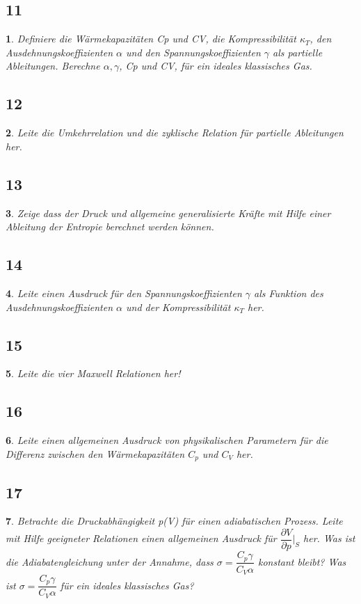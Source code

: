 \documentclass[12pt,a4paper]{report}
\newtheorem{myfrag}{}%
\begin{document}
\subsection{11}
\begin{myfrag}
Definiere die Wärmekapazitäten Cp und CV, die Kompressibilität $\kappa_T$, den
Ausdehnungskoeffizienten $\alpha$ und den Spannungskoeffizienten $\gamma$ als
partielle Ableitungen. Berechne $\alpha, \gamma$, Cp und CV, für ein ideales
klassisches Gas.
\end{myfrag}
\subsection{12}
\begin{myfrag}
Leite die Umkehrrelation und die zyklische Relation für partielle
Ableitungen her.
\end{myfrag}
\subsection{13}
\begin{myfrag}
Zeige dass der Druck und allgemeine generalisierte Kräfte mit Hilfe einer
Ableitung der Entropie berechnet werden können.
\end{myfrag}
\subsection{14}
\begin{myfrag}
Leite einen Ausdruck für den Spannungskoeffizienten $\gamma$ als Funktion des
Ausdehnungskoeffizienten $\alpha$ und der Kompressibilität $\kappa_T$ her.
\end{myfrag}
\subsection{15}
\begin{myfrag}
Leite die vier Maxwell Relationen her!
\end{myfrag}
\subsection{16}
\begin{myfrag}
Leite einen allgemeinen Ausdruck von physikalischen Parametern für die
Differenz zwischen den Wärmekapazitäten $C_p$ und $C_V$ her.
\end{myfrag}
\subsection{17}
\begin{myfrag}
Betrachte die Druckabhängigkeit p(V) für einen adiabatischen Prozess. Leite mit
Hilfe geeigneter Relationen einen allgemeinen Ausdruck für $\dfrac{\partial V}{\partial p}|_S$ her. Was ist die
Adiabatengleichung unter der Annahme, dass $\sigma = \dfrac{C_p\gamma}{C_V\alpha}$ konstant bleibt? Was ist $\sigma = \dfrac{C_p\gamma}{C_V\alpha}$ für ein ideales klassisches Gas?
\end{myfrag}
\end{document}

